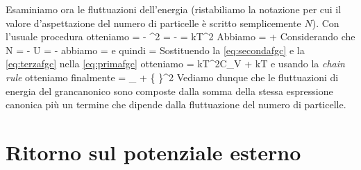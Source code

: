 Esaminiamo ora le fluttuazioni dell'energia (ristabiliamo la notazione per cui il valore d'aspettazione del numero di particelle è scritto semplicemente $N$). Con l'usuale procedura otteniamo
\be
\label{eq:primafgc}
 =  - ^2 = - = kT^2
\ee
Abbiamo
\be
\label{eq:secondafgc}
 =  + 
\ee
Considerando che
\be
N = - \quad\quad\quad U = -
\ee
abbiamo
\be
{} = 
\ee
e quindi
\be
\label{eq:terzafgc}
 = 
\ee
Sostituendo la \ref{eq:secondafgc} e la \ref{eq:terzafgc} nella \ref{eq:primafgc} otteniamo
\be
{} = kT^2C_V + kT
\ee
e usando la {\em chain rule} otteniamo finalmente
\be
{} = _{} + 
\left\{
\right\}^2 
\ee
Vediamo dunque che le fluttuazioni di energia del grancanonico sono composte dalla somma della stessa espressione canonica più un termine che dipende dalla fluttuazione del numero di particelle.	

\section{Ritorno sul potenziale esterno}
\label{sec:potesternoGC}

